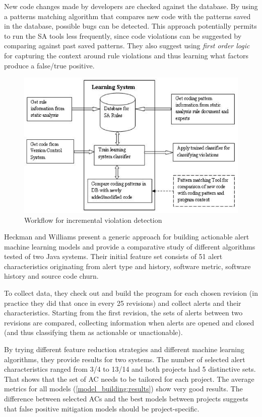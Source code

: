 \documentclass{article}
\begin{document}
 New code changes made by developers are checked against the database. By using a patterns matching algorithm that compares new code with the patterns saved in the database, possible bugs can be detected. This approach potentially permits to run the SA tools less frequently, since code violations can be suggested by comparing against past saved patterns. They also suggest using \textit{first order logic} for capturing the context around rule violations and thus learning what factors produce a false/true positive.

 \begin{figure}[H]
     \centering
     \includegraphics[scale=0.3]{./src/incremental_sa_workflow.png}
     \caption{Workflow for incremental violation detection}\label{incremental_sa:workflow}
 \end{figure}


 Heckman and Williams \cite{model_building_actionable} present a generic approach for building actionable alert machine learning models and provide a comparative study of different algorithms tested of two Java systems. Their initial feature set consists of 51 alert characteristics originating from alert type and history, software metric, software history and source code churn.

 To collect data, they check out and build the program for each chosen revision (in practice they did that once in every 25 revisions) and collect alerts and their characteristics. Starting from the first revision, the sets of alerts between two revisions are compared, collecting information when alerts are opened and closed (and thus classifying them as actionable or unactionable).

 By trying different feature reduction strategies and different machine learning algorithms, they provide results for two systems. The number of selected alert characteristics ranged from 3/4 to 13/14 and both projects had 5 distinctive sets. That shows that the set of AC needs to be tailored for each project. The average metrics for all models (\cref{model_building:results}) show very good results. The difference between selected ACs and
 the best models between projects suggests that false positive mitigation models should be project-specific.
\end{document}
